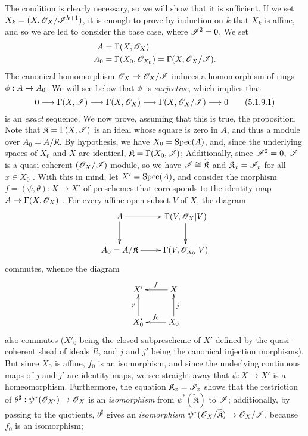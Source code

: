 The condition is clearly necessary, so we will show that it is sufficient.
If we set $X_k=(X,\mathscr{O}_X/\mathscr{I}^{k+1})$, it is enough to prove by induction on $k$ that $X_k$ is affine, and so we are led to consider the base case, where $\mathscr{I}^2=0$.
We set
\begin{align*}
  A&=\Gamma(X,\mathscr{O}_X)\\
  A_0&=\Gamma(X_0,\mathscr{O}_{X_0})=\Gamma(X,\mathscr{O}_X/\mathscr{I}).
\end{align*}
The canonical homomorphism $\sh{O}_X\to\sh{O}_X/\sh{I}$ induces a homomorphism of rings $\vphi:A\to A_0$.
We will see below that $\phi$ is \emph{surjective}, which implies that
\[
\label{1.5.1.9.1}
  0\to\Gamma(X,\sh{I})\to\Gamma(X,\sh{O}_X)\to\Gamma(X,\sh{O}_X/\sh{I})\to 0\tag{5.1.9.1}
\]
is an \emph{exact} sequence.
We now prove, assuming that this is true, the proposition.
Note that $\mathfrak{K}=\Gamma(X,\mathscr{I})$ is an ideal whose square is zero in $A$, and thus a module over $A_0=A/\mathfrak{K}$.
By hypothesis, we have $X_0=\operatorname{Spec}(A)$, and, since the underlying spaces of $X_0$ and $X$ are identical, $\mathfrak{K}=\Gamma(X_0,\mathscr{I})$;
Additionally, since $\mathscr{I}^2=0$, $\mathscr{I}$ is a quasi-coherent $(\mathscr{O}_X/\mathscr{I})$-module, so we have $\mathscr{I}\cong\widetilde{\mathfrak{K}}$ and $\mathfrak{K}_x=\mathscr{I}_x$ for all $x\in X_0$ .
With this in mind, let $X'=\operatorname{Spec}(A)$, and consider the morphism $f=(\psi,\theta):X\to X'$ of preschemes that corresponds to the identity map $A\to\Gamma(X,\sh{O}_X)$ .
For every affine open subset $V$ of $X$, the diagram
\[
  \xymatrix{
    A\ar[r]\ar[d] &
    \Gamma(V,\sh{O}_X|V)\ar[d]\\
    A_0=A/\mathfrak{K}\ar[r] &
    \Gamma(V,\sh{O}_{X_0}|V)
  }
\]
commutes, whence the diagram
\[
  \xymatrix{
    X' &
    X\ar[l]_f\\
    X'_0\ar[u]^{j'} &
    X_0\ar[l]_{f_0}\ar[u]_j
  }
\]
also commutes ($X'_0$ being the closed subprescheme of $X'$ defined by the quasi-coherent sheaf of ideals $\widetilde{R}$, and $j$ and $j'$ being the canonical injection morphisms).
But since $X_0$ is affine, $f_0$ is an isomorphism, and since the underlying continuous maps of $j$ and $j'$ are identity maps, we see straight away that $\psi:X\to X'$ is a homeomorphism.
Furthermore, the equation $\mathfrak{K}_x=\mathscr{I}_x$ shows that the restriction of $\theta^\sharp:\psi^*(\sh{O}_{X'})\to\sh{O}_X$ is an \emph{isomorphism} from $\psi^*(\widetilde{\mathfrak{K}})$ to $\mathscr{I}$;
additionally, by passing to the quotients, $\theta^\sharp$ gives an \emph{isomorphism} $\psi^*(\sh{O}_X/\widetilde{\mathfrak{K}})\to\sh{O}_X/\sh{I}$, because $f_0$ is an isomorphism;
